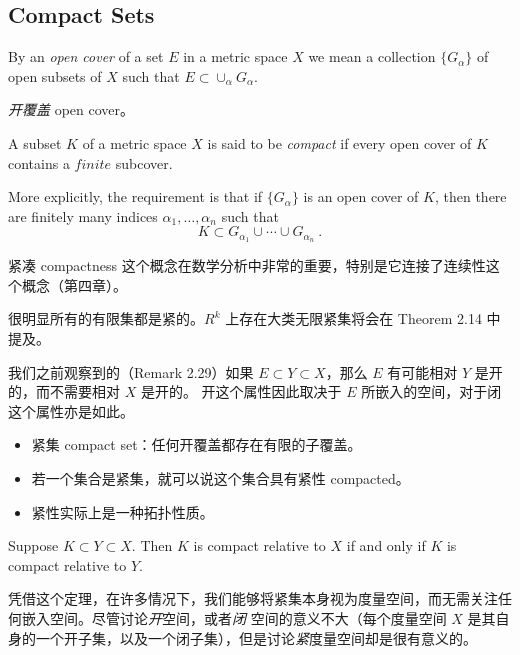 \documentclass[../poma-notes.tex]{subfiles}
\begin{document}
\subsection*{Compact Sets}

\begin{definition}
  By an \textit{open cover} of a set $E$ in a metric space $X$ we mean a collection $\{G_{\alpha}\}$ of open subsets
  of $X$ such that $E \subset \cup_{\alpha} G_{\alpha}$.
\end{definition}

\anote \textit{开覆盖} open cover。

\begin{definition}
  A subset $K$ of a metric space $X$ is said to be \textit{compact} if every open cover of $K$ contains a $finite$
  subcover.

  More explicitly, the requirement is that if $\{G_{\alpha}\}$ is an open cover of $K$, then there are finitely many
  indices $\alpha_1,\dots,\alpha_n$ such that
  \[K \subset G_{\alpha_1} \cup \cdots \cup G_{\alpha_n}\ .\]
\end{definition}

紧凑 compactness 这个概念在数学分析中非常的重要，特别是它连接了连续性这个概念（第四章）。

很明显所有的有限集都是紧的。$R^k$ 上存在大类无限紧集将会在 Theorem 2.14 中提及。

我们之前观察到的（Remark 2.29）如果 $E \subset Y \subset X$，那么 $E$ 有可能相对 $Y$ 是开的，而不需要相对 $X$ 是开的。
开这个属性因此取决于 $E$ 所嵌入的空间，对于闭这个属性亦是如此。

\begin{anote}
  \begin{itemize}
    \item 紧集 compact set：任何开覆盖都存在有限的子覆盖。
    \item 若一个集合是紧集，就可以说这个集合具有紧性 compacted。
    \item 紧性实际上是一种拓扑性质。
  \end{itemize}
\end{anote}

\begin{theorem}
  Suppose $K \subset Y \subset X$. Then $K$ is compact relative to $X$ if and only if $K$ is compact relative to $Y$.
\end{theorem}

凭借这个定理，在许多情况下，我们能够将紧集本身视为度量空间，而无需关注任何嵌入空间。尽管讨论\textit{开}空间，或者\textit{闭}
空间的意义不大（每个度量空间 $X$ 是其自身的一个开子集，以及一个闭子集），但是讨论\textit{紧}度量空间却是很有意义的。
\end{document}

